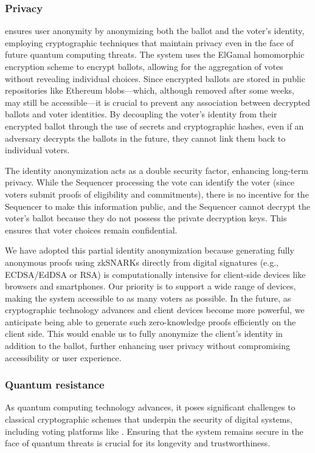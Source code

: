 \subsubsection{Privacy}

\Davinci ensures user anonymity by anonymizing both the ballot and the voter's identity, employing cryptographic techniques that maintain privacy even in the face of future quantum computing threats. The system uses the ElGamal homomorphic encryption scheme to encrypt ballots, allowing for the aggregation of votes without revealing individual choices. Since encrypted ballots are stored in public repositories like Ethereum blobs—which, although removed after some weeks, may still be accessible—it is crucial to prevent any association between decrypted ballots and voter identities. By decoupling the voter's identity from their encrypted ballot through the use of secrets and cryptographic hashes, even if an adversary decrypts the ballots in the future, they cannot link them back to individual voters.

The identity anonymization acts as a double security factor, enhancing long-term privacy. While the Sequencer processing the vote can identify the voter (since voters submit proofs of eligibility and commitments), there is no incentive for the Sequencer to make this information public, and the Sequencer cannot decrypt the voter's ballot because they do not possess the private decryption keys. This ensures that voter choices remain confidential.

We have adopted this partial identity anonymization because generating fully anonymous proofs using zkSNARKs directly from digital signatures (e.g., ECDSA/EdDSA or RSA) is computationally intensive for client-side devices like browsers and smartphones. Our priority is to support a wide range of devices, making the system accessible to as many voters as possible. In the future, as cryptographic technology advances and client devices become more powerful, we anticipate being able to generate such zero-knowledge proofs efficiently on the client side. This would enable us to fully anonymize the client's identity in addition to the ballot, further enhancing user privacy without compromising accessibility or user experience.

\subsubsection{Quantum resistance}

As quantum computing technology advances, it poses significant challenges to classical cryptographic schemes that underpin the security of digital systems, including voting platforms like \davinci. Ensuring that the system remains secure in the face of quantum threats is crucial for its longevity and trustworthiness.


